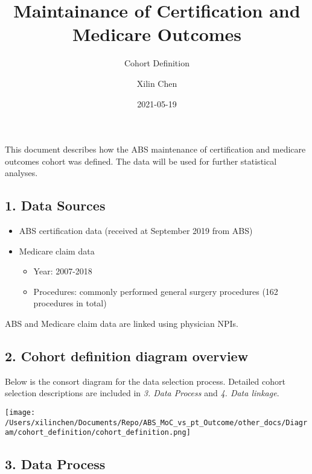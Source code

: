 \documentclass[
]{article}
\title{Maintainance of Certification and Medicare Outcomes}
\subtitle{Cohort Definition}
\author{Xilin Chen}
\date{2021-05-19}
\providecommand{\tightlist}{%
  \setlength{\itemsep}{0pt}\setlength{\parskip}{0pt}}
\begin{document}
\maketitle

{
\setcounter{tocdepth}{3}
\tableofcontents
}
This document describes how the ABS maintenance of certification and
medicare outcomes cohort was defined. The data will be used for further
statistical analyses.

\hypertarget{data-sources}{%
\subsection{1. Data Sources}\label{data-sources}}

\begin{itemize}
\tightlist
\item
  ABS certification data (received at September 2019 from ABS)
\item
  Medicare claim data

  \begin{itemize}
  \tightlist
  \item
    Year: 2007-2018
  \item
    Procedures: commonly performed general surgery procedures (162
    procedures in total)
  \end{itemize}
\end{itemize}

ABS and Medicare claim data are linked using physician NPIs.

\pagebreak

\hypertarget{cohort-definition-diagram-overview}{%
\subsection{2. Cohort definition diagram
overview}\label{cohort-definition-diagram-overview}}

Below is the consort diagram for the data selection process. Detailed
cohort selection descriptions are included in \emph{3. Data Process} and
\emph{4. Data linkage}.

\texttt{[image: /Users/xilinchen/Documents/Repo/ABS\_MoC\_vs\_pt\_Outcome/other\_docs/Diagram/cohort\_definition/cohort\_definition.png]}

\hypertarget{data-process}{%
\subsection{3. Data Process}\label{data-process}}
\end{document}
